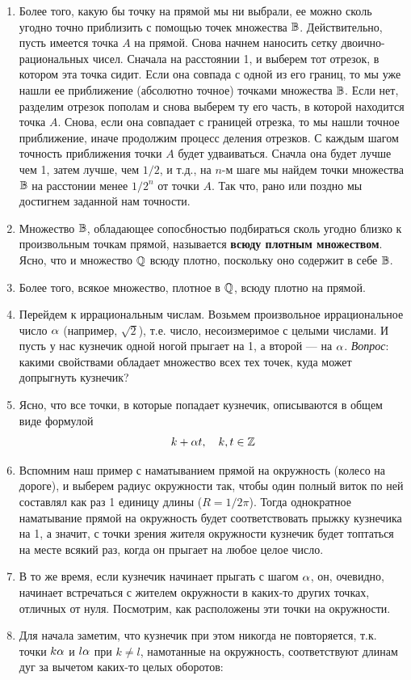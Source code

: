 \begin{enumerate}
\item Более того, какую бы точку на прямой мы ни выбрали, ее можно сколь угодно точно приблизить с помощью точек множества $\mathbb B$. Действительно, пусть имеется точка $A$ на прямой. Снова начнем наносить сетку двоично-рациональных чисел. Сначала на расстоянии 1, и выберем тот отрезок, в котором эта точка сидит. Если она совпада с одной из его границ, то мы уже нашли ее приближение (абсолютно точное) точками множества $\mathbb B$. Если нет, разделим отрезок пополам и снова выберем ту его часть, в которой находится точка $A$. Снова, если она совпадает с границей отрезка, то мы нашли точное приближение, иначе продолжим процесс деления отрезков. С каждым шагом точность приближения точки $A$ будет удваиваться. Сначла она будет лучше чем 1, затем лучше, чем $1/2$, и т.д., на $n$-м шаге мы найдем точки множества $\mathbb B$ на расстонии менее $1/2^n$ от точки $A$. Так что, рано или поздно мы достигнем заданной нам точности.
\item Множество $\mathbb B$, обладающее сопосбностью подбираться сколь угодно близко к произвольным точкам прямой, называется \textbf{всюду плотным множеством}. Ясно, что и множество $\mathbb Q$ всюду плотно, поскольку оно содержит в себе $\mathbb B$.
\item Более того, всякое множество, плотное в $\mathbb Q$, всюду плотно на прямой.
\item Перейдем к иррациональным числам. Возьмем произвольное иррациональное число $\alpha$ (например, $\sqrt 2$), т.е. число, несоизмеримое с целыми числами. И пусть у нас кузнечик одной ногой прыгает на 1, а второй --- на $\alpha$. \textit{Вопрос}: какими свойствами обладает множество всех тех точек, куда может допрыгнуть кузнечик?
\item Ясно, что все точки, в которые попадает кузнечик, описываются в общем виде формулой
$$
k + \alpha t,\quad k,t\in\mathbb Z
$$
\item Вспомним наш пример с наматыванием прямой на окружность (колесо на дороге), и выберем радиус окружности так, чтобы один полный виток по ней составлял как раз 1 единицу длины ($R=1/2\pi$). Тогда однократное наматывание прямой на окружность будет соответствовать прыжку кузнечика на 1, а значит, с точки зрения жителя окружности кузнечик будет топтаться на месте всякий раз, когда он прыгает на любое целое число.
\item В то же время, если кузнечик начинает прыгать с шагом $\alpha$, он, очевидно, начинает встречаться с жителем окружности в каких-то других точках, отличных от нуля. Посмотрим, как расположены эти точки на окружности.
\item Для начала заметим, что кузнечик при этом никогда не повторяется, т.к. точки $k\alpha$ и $l\alpha$ при $k\ne l$, намотанные на окружность, соответствуют длинам дуг за вычетом каких-то целых оборотов:

\end{enumerate}
